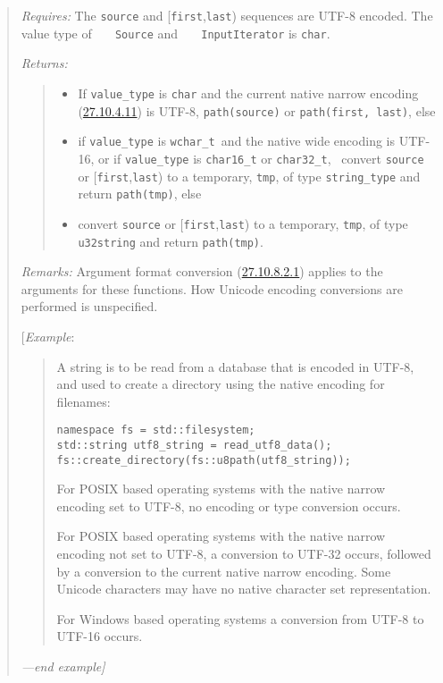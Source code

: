 \begin{quote}
\emph{Requires:} The \texttt{source} and
{[}\texttt{first},\texttt{last}) sequences are UTF-8 encoded. The value
type of \texttt{\ \ \ Source} and \texttt{\ \ \ InputIterator} is
\texttt{char}.

\emph{Returns:}

\begin{quote}
\begin{itemize}
\tightlist
\item
  If \texttt{value\_type} is \texttt{char} and the current native narrow
  encoding (\hyperref[fs.def.native.encode]{27.10.4.11}) is UTF-8,
  \texttt{path(source)} or \texttt{path(first,\ last)}, else
\item
  if \texttt{value\_type} is \texttt{wchar\_t\ }and the native wide
  encoding is UTF-16, or if \texttt{value\_type} is \texttt{char16\_t}
  or \texttt{char32\_t},~ convert \texttt{source} or
  {[}\texttt{first},\texttt{last}) to a temporary, \texttt{tmp}, of type
  \texttt{string\_type} and return \texttt{path(tmp)}, else
\item
  convert \texttt{source} or {[}\texttt{first},\texttt{last}) to a
  temporary, \texttt{tmp}, of type \texttt{u32string} and return
  \texttt{path(tmp)}.
\end{itemize}
\end{quote}

\emph{Remarks:} Argument format conversion
(\hyperref[path.fmt.cvt]{27.10.8.2.1}) applies to the arguments for
these functions. How Unicode encoding conversions are performed is
unspecified.

{[}\emph{Example}:

\begin{quote}
A string is to be read from a database that is encoded in UTF-8, and
used to create a directory using the native encoding for filenames:

\begin{verbatim}
namespace fs = std::filesystem;
std::string utf8_string = read_utf8_data();
fs::create_directory(fs::u8path(utf8_string));
\end{verbatim}

For POSIX based operating systems with the native narrow encoding set to
UTF-8, no encoding or type conversion occurs.

For POSIX based operating systems with the native narrow encoding not
set to UTF-8, a conversion to UTF-32 occurs, followed by a conversion to
the current native narrow encoding. Some Unicode characters may have no
native character set representation.

For Windows based operating systems a conversion from UTF-8 to UTF-16
occurs.
\end{quote}

\emph{---end example{]}}
\end{quote}

